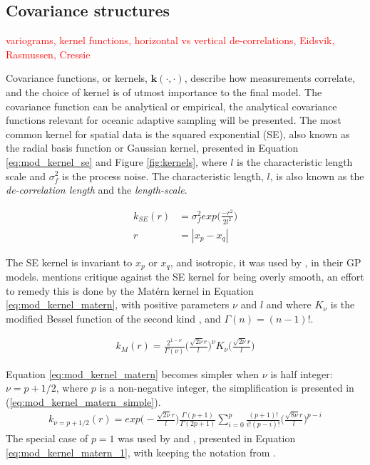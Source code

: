 \subsection{Covariance structures}
\textcolor{red}{variograms, kernel functions, horizontal vs vertical de-correlations, Eidsvik, Rasmussen, Cressie}

Covariance functions, or kernels, $\mathbf{k}(\cdot,\cdot)$, describe how measurements correlate, and the choice of kernel is of utmost importance to the final model. The covariance function can be analytical or empirical, the analytical covariance functions relevant for oceanic adaptive sampling will be presented. The most common kernel for spatial data is the squared exponential (SE), also known as the radial basis function or Gaussian kernel, presented in Equation \eqref{eq:mod_kernel_se} and Figure \ref{fig:kernels}, where $l$ is the characteristic length scale and $\sigma_f^2$ is the process noise. The characteristic length, $l$, is also known as the \textit{de-correlation length} and the \textit{length-scale}. 

\begin{align}
\label{eq:mod_kernel_se}
    k_{SE}(r) &= \sigma_f^2 exp\Big(\frac{-r^2}{2 l^2}\Big)\\
    r &= |x_p-x_q|
\end{align}

The SE kernel is invariant to $x_p$ or $x_q$, and isotropic, it was used by \textcite{kemna2018multi}, \textcite{stankiewicz2021adaptive} in their GP models. \textcite{rasmussen2003gaussian} mentions critique against the SE kernel for being overly smooth, an effort to remedy this is done by the Matérn kernel in Equation \eqref{eq:mod_kernel_matern}, with positive parameters $\nu$ and $l$ and where $K_{\nu}$ is the modified Bessel function of the second kind \cite{abramowitz1965handbook}, and $\Gamma(n) = (n-1)!$. 

\begin{align}
    \label{eq:mod_kernel_matern}
    k_M(r) = \frac{2^{1-\nu}}{\Gamma(\nu)} \Big(\frac{\sqrt{2\nu}r}{l}\Big)^{\nu} K_{\nu} \Big(\frac{\sqrt{2\nu}r}{l}\Big)
\end{align}

Equation \eqref{eq:mod_kernel_matern} becomes simpler when $\nu$ is half integer: $\nu = p + 1/2$, where $p$ is a non-negative integer, the simplification is presented in (\ref{eq:mod_kernel_matern_simple}).
\begin{align}
    \label{eq:mod_kernel_matern_simple}
    k_{\nu = p + 1/2} (r) = exp\Big(-\frac{\sqrt{2\nu }r}{l}\Big)\frac{\Gamma(p+1)}{\Gamma(2p+1)}\sum_{i=0}^p \frac{(p+1)!}{i!(p-i)!}\Big(\frac{\sqrt{8\nu}r}{l}\Big)^{p-i}
\end{align}
The special case of $p=1$ was used by  \textcite{fossum2018information,fossum2019toward,fossum2019adaptive} and \textcite{berget2018adaptive}, presented in Equation \eqref{eq:mod_kernel_matern_1}, with keeping the notation from \textcite{rasmussen2003gaussian}. 

